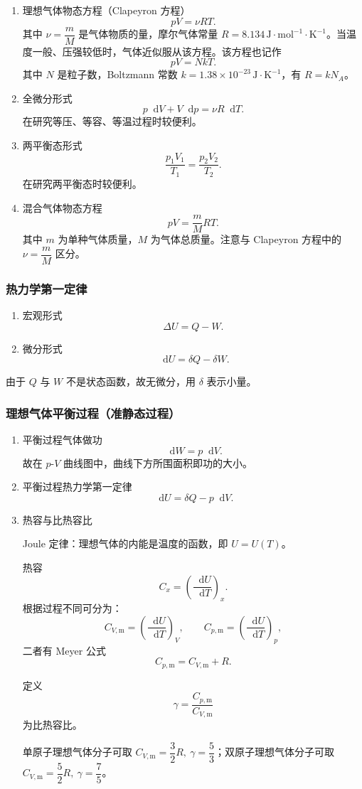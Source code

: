 \documentclass[UTF8,fontset=fandol,zihao=5]{ctexart}
\newcommand{\dif}{\mathop{}\!\mathrm{d}}
\begin{document}
\begin{enumerate}
  \item 理想气体物态方程（Clapeyron 方程）
  \[
    pV=\nu RT.
  \]
  其中 \(\nu=\dfrac mM\) 是气体物质的量，摩尔气体常量 \(R=8.134\,\mathrm{J\cdot mol^{-1}\cdot K^{-1}}\)。当温度一般、压强较低时，气体近似服从该方程。该方程也记作
  \[
    pV=NkT.
  \]
  其中 \(N\) 是粒子数，Boltzmann 常数 \(k=1.38\times10^{-23}\,\mathrm{J\cdot K^{-1}}\)，有 \(R=kN_A\)。

  \item 全微分形式
  \[
    p\dif V+V\dif p=\nu R\dif T.
  \]
  在研究等压、等容、等温过程时较便利。

  \item 两平衡态形式
  \[
    \frac{p_1V_1}{T_1}=\frac{p_2V_2}{T_2}.
  \]
  在研究两平衡态时较便利。

  \item 混合气体物态方程
  \[
    pV=\frac mMRT.
  \]
  其中 \(m\) 为单种气体质量，\(M\) 为气体总质量。注意与 Clapeyron 方程中的 \(\nu=\dfrac mM\) 区分。
\end{enumerate}

\subsubsection{热力学第一定律}

\begin{enumerate}
  \item 宏观形式
  \[
    \Delta U=Q-W.
  \]
  \item 微分形式
  \[
    \dif U=\delta Q-\delta W.
  \]
\end{enumerate}

由于 \(Q\) 与 \(W\) 不是状态函数，故无微分，用 \(\delta\) 表示小量。

\subsubsection{理想气体平衡过程（准静态过程）}

\begin{enumerate}
  \item 平衡过程气体做功
  \[
    \dif W=p\dif V.
  \]
  故在 \(p\)-\(V\) 曲线图中，曲线下方所围面积即功的大小。

  \item 平衡过程热力学第一定律
  \[
    \dif U=\delta Q-p\dif V.
  \]

  \item 热容与比热容比

  Joule 定律：理想气体的内能是温度的函数，即 \(U=U(T)\)。

  热容
  \[
    C_x=\left(\frac{\dif U}{\dif T}\right)_x.
  \]
  根据过程不同可分为：
  \[
    C_{V,\mathrm m}=\left(\frac{\dif U}{\dif T}\right)_V,
    \qquad
    C_{p,\mathrm m}=\left(\frac{\dif U}{\dif T}\right)_p,
  \]
  二者有 Meyer 公式
  \[
    C_{p,\mathrm m}=C_{V,\mathrm m}+R.
  \]

  定义
  \[
    \gamma=\frac{C_{p,\mathrm m}}{C_{V,\mathrm m}}
  \]
  为比热容比。

  单原子理想气体分子可取 \(C_{V,\mathrm m}=\dfrac32R,\ \gamma=\dfrac53\)；双原子理想气体分子可取 \(C_{V,\mathrm m}=\dfrac52R,\ \gamma=\dfrac75\)。
\end{enumerate}
\end{document}
